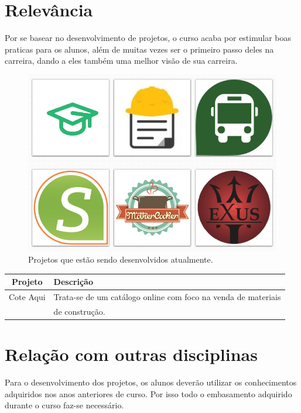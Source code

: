 \documentclass{article}
\begin{document}
\section{Relevância}
	Por se basear no desenvolvimento de projetos, o curso acaba por estimular boas praticas para os alunos, além de muitas vezes ser o primeiro passo deles na carreira, dando a eles também uma melhor visão de sua carreira.

\begin{figure}[h!]
    \centering
    \includegraphics[scale=0.3]{imagem_02.jpg}
    \caption{Projetos que estão sendo desenvolvidos atualmente.}
    \label{fig:imagem_02.jpg}
\end{figure}

\begin{table}[h]
    \centering
    \begin{tabular}{c|l}
        Projeto&Descrição\\
        \hline
        Cote Aqui \cite{ref_coteaqui}&Trata-se de um catálogo online com foco na venda de materiais\\&de construção.
    \end{tabular}
    \label{tab:my_label}
\end{table}

\section{Relação com outras disciplinas}
	Para o desenvolvimento dos projetos, os alunos deverão utilizar os conhecimentos adquiridos nos anos anteriores de curso. Por isso todo o embasamento adquirido durante o curso faz-se necessário.



\end{document}
